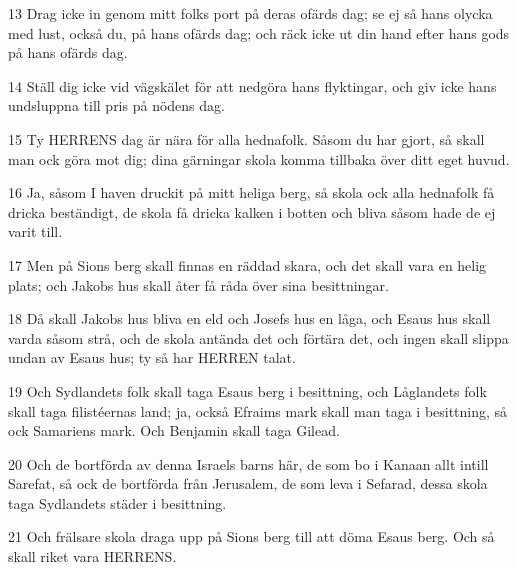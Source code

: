 \par 13 Drag icke in genom mitt folks port på deras ofärds dag; se ej så hans olycka med lust, också du, på hans ofärds dag; och räck icke ut din hand efter hans gods på hans ofärds dag.
\par 14 Ställ dig icke vid vägskälet för att nedgöra hans flyktingar, och giv icke hans undsluppna till pris på nödens dag.
\par 15 Ty HERRENS dag är nära för alla hednafolk. Såsom du har gjort, så skall man ock göra mot dig; dina gärningar skola komma tillbaka över ditt eget huvud.
\par 16 Ja, såsom I haven druckit på mitt heliga berg, så skola ock alla hednafolk få dricka beständigt, de skola få dricka kalken i botten och bliva såsom hade de ej varit till.
\par 17 Men på Sions berg skall finnas en räddad skara, och det skall vara en helig plats; och Jakobs hus skall åter få råda över sina besittningar.
\par 18 Då skall Jakobs hus bliva en eld och Josefs hus en låga, och Esaus hus skall varda såsom strå, och de skola antända det och förtära det, och ingen skall slippa undan av Esaus hus; ty så har HERREN talat.
\par 19 Och Sydlandets folk skall taga Esaus berg i besittning, och Låglandets folk skall taga filistéernas land; ja, också Efraims mark skall man taga i besittning, så ock Samariens mark. Och Benjamin skall taga Gilead.
\par 20 Och de bortförda av denna Israels barns här, de som bo i Kanaan allt intill Sarefat, så ock de bortförda från Jerusalem, de som leva i Sefarad, dessa skola taga Sydlandets städer i besittning.
\par 21 Och frälsare skola draga upp på Sions berg till att döma Esaus berg. Och så skall riket vara HERRENS.


